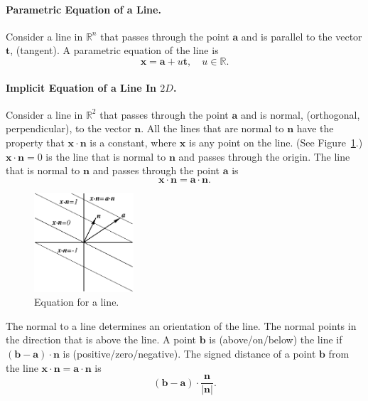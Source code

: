 \paragraph{Parametric Equation of a Line.}
Consider a line in $\mathbb{R}^n$ that passes through the point 
$\mathbf{a}$ and is parallel to
the vector $\mathbf{t}$, (tangent).  A parametric equation of the line is
\[
\mathbf{x} = \mathbf{a} + u \mathbf{t}, \quad u \in \mathbb{R}.
\]





\paragraph{Implicit Equation of a Line In $2D$.}
Consider a line in $\mathbb{R}^2$ that passes through the point 
$\mathbf{a}$ and is normal, (orthogonal, perpendicular), to the vector 
$\mathbf{n}$.  All the lines that are 
normal to $\mathbf{n}$ have the property that $\mathbf{x} \cdot \mathbf{n}$ is a 
constant, where $\mathbf{x}$ is any point on the line.  
(See Figure~\ref{dotlines}.)
$\mathbf{x} \cdot \mathbf{n} = 0$ is the line that is normal to $\mathbf{n}$
and passes through the origin.  The line that is normal to $\mathbf{n}$
and passes through the point $\mathbf{a}$ is
\[
\mathbf{x} \cdot \mathbf{n} = \mathbf{a} \cdot \mathbf{n}.
\]

\begin{figure}[htb!]
\begin{center}
  \includegraphics[width=0.33\textwidth]{algebra/vectors/dotlines}
\end{center}
\caption{Equation for a line.}
\label{dotlines}
\end{figure}


The normal to a line determines an orientation of the line.  The normal 
points in the direction that is above the line.  A point $\mathbf{b}$ is 
(above/on/below) the line if $(\mathbf{b} - \mathbf{a}) \cdot \mathbf{n}$ is 
(positive/zero/negative).  The signed distance of a point $\mathbf{b}$
from the line
$ \mathbf{x} \cdot \mathbf{n} = \mathbf{a} \cdot \mathbf{n}$ is 
\[
(\mathbf{b} - \mathbf{a}) \cdot \frac{\mathbf{n}}{|\mathbf{n}|}.
\]







